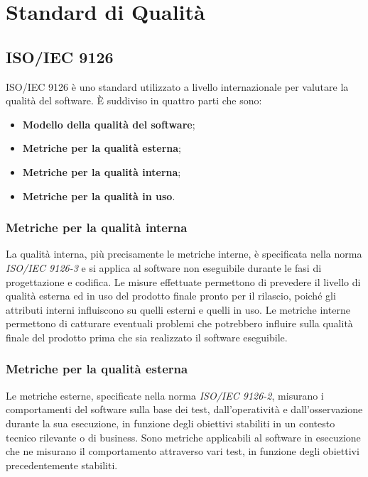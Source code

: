 \appendix
\section{Standard di Qualità}

\subsection{ISO/IEC 9126}
ISO/IEC 9126 è uno standard utilizzato a livello internazionale per valutare la qualità del software.
È suddiviso in quattro parti che sono:
\begin{itemize}
\item \textbf{Modello della qualità del software};
\item \textbf{Metriche per la qualità esterna};
\item \textbf{Metriche per la qualità interna};
\item \textbf{Metriche per la qualità in uso}.
\end{itemize}

\subsubsection{Metriche per la qualità interna}
La qualità interna, più precisamente le metriche interne, è specificata nella norma \textit{ISO/IEC 9126-3} e si applica al software non eseguibile durante le fasi di progettazione e codifica. 
Le misure effettuate permettono di prevedere il livello di qualità esterna ed in uso del prodotto finale pronto per il rilascio, poiché gli attributi interni influiscono su quelli esterni e quelli in uso. 
Le metriche interne permettono di catturare eventuali problemi che potrebbero influire sulla qualità finale del prodotto prima che sia realizzato il software eseguibile. 

\subsubsection{Metriche per la qualità esterna}
Le metriche esterne, specificate nella norma \textit{ISO/IEC 9126-2}, misurano i comportamenti del software sulla base dei test, dall'operatività e dall'osservazione durante la sua esecuzione, in funzione degli obiettivi stabiliti in un contesto tecnico rilevante o di business. Sono metriche applicabili al software in esecuzione che ne misurano il comportamento attraverso vari test, in funzione degli obiettivi precedentemente stabiliti.

